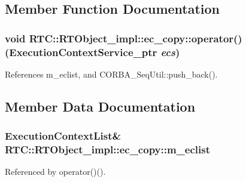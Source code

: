 \subsection{Member Function Documentation}
\subsubsection[{operator()}]{\setlength{\rightskip}{0pt plus 5cm}void RTC::RTObject\_\-impl::ec\_\-copy::operator() (ExecutionContextService\_\-ptr {\em ecs})\hspace{0.3cm}{\ttfamily  [inline]}}\label{structRTC_1_1RTObject__impl_1_1ec__copy_a80a576f8f6eb88e1a198e1d64b2120d0}


References m\_\-eclist, and CORBA\_\-SeqUtil::push\_\-back().



\subsection{Member Data Documentation}
\subsubsection[{m\_\-eclist}]{\setlength{\rightskip}{0pt plus 5cm}ExecutionContextList\& {\bf RTC::RTObject\_\-impl::ec\_\-copy::m\_\-eclist}}\label{structRTC_1_1RTObject__impl_1_1ec__copy_a3027e3f7b4691a917399bd64eca9ef06}


Referenced by operator()().


